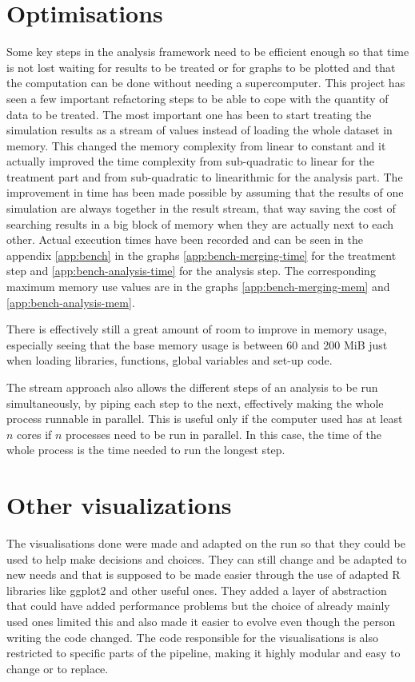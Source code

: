 \documentclass[a4paper,12pt]{report}
\begin{document}
\section{Optimisations}
Some key steps in the analysis framework need to be efficient enough so that time is not lost waiting for results to be treated or for graphs to be plotted and that the computation can be done without needing a supercomputer.
This project has seen a few important refactoring steps to be able to cope with the quantity of data to be treated. The most important one has been to start treating the simulation results as a stream of values instead of loading the whole dataset in memory. This changed the memory complexity from linear to constant and it actually improved the time complexity from sub-quadratic to linear for the treatment part and from sub-quadratic to linearithmic for the analysis part. The improvement in time has been made possible by assuming that the results of one simulation are always together in the result stream, that way saving the cost of searching results in a big block of memory when they are actually next to each other.
Actual execution times have been recorded and can be seen in the appendix \ref{app:bench} in the graphs \ref{app:bench-merging-time} for the treatment step and \ref{app:bench-analysis-time} for the analysis step. The corresponding maximum memory use values are in the graphs \ref{app:bench-merging-mem} and \ref{app:bench-analysis-mem}.

There is effectively still a great amount of room to improve in memory usage, especially seeing that the base memory usage is between 60 and 200 MiB just when loading libraries, functions, global variables and set-up code.

The stream approach also allows the different steps of an analysis to be run simultaneously, by piping each step to the next, effectively making the whole process runnable in parallel. This is useful only if the computer used has at least $n$ cores if $n$ processes need to be run in parallel. In this case, the time of the whole process is the time needed to run the longest step.

\section{Other visualizations}
The visualisations done were made and adapted on the run so that they could be used to help make decisions and choices. They can still change and be adapted to new needs and that is supposed to be made easier through the use of adapted R libraries like ggplot2 and other useful ones. They added a layer of abstraction that could have added performance problems but the choice of already mainly used ones limited this and also made it easier to evolve even though the person writing the code changed. The code responsible for the visualisations is also restricted to specific parts of the pipeline, making it highly modular and easy to change or to replace.
\end{document}
